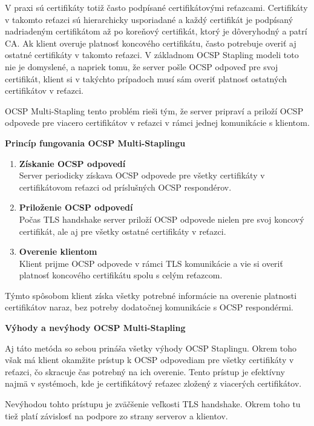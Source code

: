 \documentclass[12pt, twoside]{book}
\newcommand{\subsubsubsection}[1]{%
  \vspace{0.2em}  
  \textbf{#1} \\[0.2em]
  \hspace*{\parindent}
}
\begin{document}
V praxi sú certifikáty totiž často podpísané certifikátovými reťazcami. Certifikáty v takomto reťazci sú hierarchicky usporiadané a každý certifikát je podpísaný nadriadeným certifikátom až po koreňový certifikát, ktorý je dôveryhodný a patrí CA. Ak klient overuje platnosť koncového certifikátu, často potrebuje overiť aj ostatné certifikáty v takomto reťazci. V základnom OCSP Stapling modeli toto nie je domyslené, a napriek tomu, že server pošle OCSP odpoveď pre svoj certifikát, klient si v takýchto prípadoch musí sám overiť platnosť ostatných certifikátov v reťazci.\cite{turin2, rfc6961}

OCSP Multi-Stapling tento problém rieši tým, že server pripraví a priloží OCSP odpovede pre viacero certifikátov v reťazci v rámci jednej komunikácie s klientom.

\newpage
\subsubsubsection{Princíp fungovania OCSP Multi-Staplingu}
\begin{enumerate}
\item \textbf{Získanie OCSP odpovedí} \\
Server periodicky získava OCSP odpovede pre všetky certifikáty v certifikátovom reťazci od príslušných OCSP respondérov.

\item\textbf{ Priloženie OCSP odpovedí}\\
Počas TLS handshake server priloží OCSP odpovede nielen pre svoj koncový certifikát, ale aj pre všetky ostatné certifikáty v reťazci.

\item \textbf{Overenie klientom}\\
Klient prijme OCSP odpovede v rámci TLS komunikácie a vie si overiť platnosť koncového certifikátu spolu s celým reťazcom.
\end{enumerate}

Týmto spôsobom klient získa všetky potrebné informácie na overenie platnosti certifikátov naraz, bez potreby dodatočnej komunikácie s OCSP respondérmi.

\subsubsubsection{Výhody a nevýhody OCSP Multi-Stapling}
Aj táto metóda so sebou prináša všetky výhody OCSP Staplingu. Okrem toho však má klient okamžite prístup k OCSP odpovediam pre všetky certifikáty v reťazci, čo skracuje čas potrebný na ich overenie. Tento prístup je efektívny najmä v systémoch, kde je certifikátový reťazec zložený z viacerých  certifikátov.

Nevýhodou tohto prístupu je zväčšenie veľkosti TLS handshake. Okrem toho tu tiež platí závislosť na podpore zo strany serverov a klientov.\cite{smith}
\end{document}
